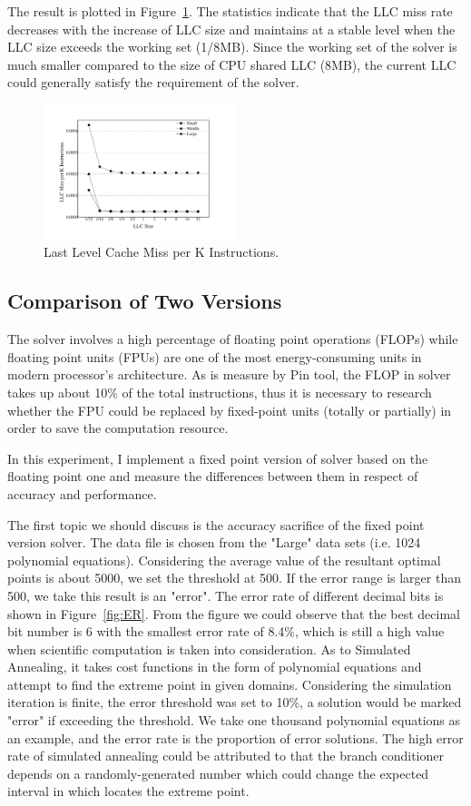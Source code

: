 The result is plotted in Figure~\ref{fig:LLC_miss}. The statistics indicate that the LLC miss rate decreases with the increase of LLC size and maintains at a stable level when the LLC size exceeds the working set (1/8MB). Since the working set of the solver is much smaller compared to the size of CPU shared LLC (8MB), the current LLC could generally satisfy the requirement of the solver.
\begin{figure}
\centering
\includegraphics[width=0.50\textwidth]{graph/LLC_miss.pdf}
\caption{Last Level Cache Miss per K Instructions.}
\label{fig:LLC_miss}
\end{figure}

\subsection{Comparison of Two Versions}
\label{sec:comparison} 
The \SA solver involves a high percentage of floating point operations (FLOPs) while floating point units (FPUs) are one of the most energy-consuming units in modern processor's architecture. As is measure by Pin tool, the FLOP in \SA solver takes up about 10\% of the total instructions, thus it is necessary to research whether the FPU could be replaced by fixed-point units (totally or partially) in order to save the computation resource. 

In this experiment, I implement a fixed point version of \SA solver based on the floating point one and measure the differences between them in respect of accuracy and performance. 

The first topic we should discuss is the accuracy sacrifice of the fixed point version solver. The data file is chosen from the "Large" data sets (i.e. 1024 polynomial equations). Considering the average value of the resultant optimal points is about 5000, we set the threshold at 500. If the error range is larger than 500, we take this result is an "error". The error rate of different decimal bits is shown in Figure~\ref{fig:ER}. From the figure we could observe that the best decimal bit number is 6 with the smallest error rate of 8.4\%, which is still a high value when scientific computation is taken into consideration. As to Simulated Annealing, it takes cost functions in the form of polynomial equations and attempt to find the extreme point in given domains. Considering the simulation iteration is finite, the error threshold was set to 10\%, a solution would be marked "error" if exceeding the threshold. We take one thousand polynomial equations as an example, and the error rate is the proportion of error solutions. The high error rate of simulated annealing could be attributed to that the branch conditioner depends on a randomly-generated number which could change the expected interval in which locates the extreme point.

